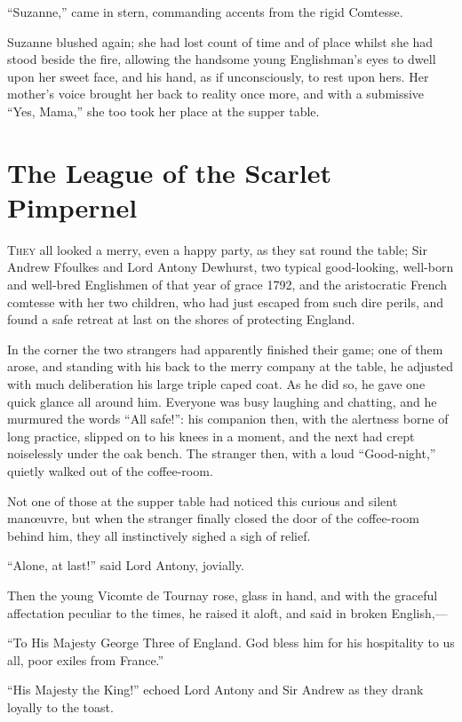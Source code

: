 \documentclass[paper=5.5in:8.5in,BCOR=7mm,twoside,DIV=calc,12pt,usegeometry,chapterprefix,endperiod,headings=big]{scrbook}
\begin{document}
\enquote{Suzanne,} came in stern, commanding accents from the rigid Comtesse.

Suzanne blushed again; she had lost count of time and of place whilst she had stood beside the fire, allowing the handsome young Englishman's eyes to dwell upon her sweet face, and his hand, as if unconsciously, to rest upon hers. Her mother's voice brought her back to reality once more, and with a submissive \enquote{Yes, Mama,} she too took her place at the supper table.

\chapter{The League of the Scarlet Pimpernel}

\lettrine[lines=4]{T}{hey} all looked a merry, even a happy party, as they sat round the table; Sir Andrew Ffoulkes and Lord Antony Dewhurst, two typical good-looking, well-born and well-bred Englishmen of that year of grace 1792, and the aristocratic French comtesse with her two children, who had just escaped from such dire perils, and found a safe retreat at last on the shores of protecting England.

In the corner the two strangers had apparently finished their game; one of them arose, and standing with his back to the merry company at the table, he adjusted with much deliberation his large triple caped coat. As he did so, he gave one quick glance all around him. Everyone was busy laughing and chatting, and he murmured the words \enquote{All safe!}: his companion then, with the alertness borne of long practice, slipped on to his knees in a moment, and the next had crept noiselessly under the oak bench. The stranger then, with a loud \enquote{Good-night,} quietly walked out of the coffee-room.

Not one of those at the supper table had noticed this curious and silent manœuvre, but when the stranger finally closed the door of the coffee-room behind him, they all instinctively sighed a sigh of relief.

\enquote{Alone, at last!} said Lord Antony, jovially.

Then the young Vicomte de Tournay rose, glass in hand, and with the graceful affectation peculiar to the times, he raised it aloft, and said in broken English,---

\enquote{To His Majesty George Three of England. God bless him for his hospitality to us all, poor exiles from France.}

\enquote{His Majesty the King!} echoed Lord Antony and Sir Andrew as they drank loyally to the toast.
\end{document}
